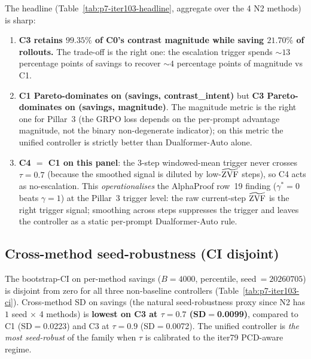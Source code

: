 The headline (Table~\ref{tab:p7-iter103-headline}, aggregate over the 4 N2
methods) is sharp:
\begin{enumerate}
\item \textbf{C3 retains $99.35\%$ of C0's contrast magnitude while
saving $21.70\%$ of rollouts.}  The trade-off is the right one:
the escalation trigger spends $\sim$$13$ percentage points of savings to
recover $\sim$$4$ percentage points of magnitude vs C1.
\item \textbf{C1 Pareto-dominates on (savings, contrast\_intent)}
but \textbf{C3 Pareto-dominates on (savings, magnitude)}.  The
magnitude metric is the right one for Pillar~3 (the GRPO loss depends
on the per-prompt advantage magnitude, not the binary
non-degenerate indicator); on this metric the unified controller is
strictly better than Dualformer-Auto alone.
\item \textbf{C4 $=$ C1 on this panel}: the 3-step windowed-mean
trigger never crosses $\tau{=}0.7$ (because the smoothed signal is
diluted by low-$\widetilde{\mathrm{ZVF}}$ steps), so C4 acts as no-escalation.  This
\emph{operationalises} the AlphaProof row~19 finding ($\gamma^*{=}0$
beats $\gamma{=}1$) at the Pillar~3 trigger level: the raw current-step
$\widetilde{\mathrm{ZVF}}$ is the right trigger signal; smoothing across steps suppresses
the trigger and leaves the controller as a static per-prompt
Dualformer-Auto rule.
\end{enumerate}

\subsection{Cross-method seed-robustness (CI disjoint)}

The bootstrap-CI on per-method savings ($B{=}4000$, percentile,
seed$~=20260705$) is disjoint from zero for all three non-baseline
controllers (Table~\ref{tab:p7-iter103-ci}).  Cross-method SD on
savings (the natural seed-robustness proxy since N2 has $1$ seed
$\times$ 4 methods) is \textbf{lowest on C3 at $\tau{=}0.7$ (SD$=$0.0099)},
compared to C1 (SD$=$0.0223) and C3 at $\tau{=}0.9$ (SD$=$0.0072).
The unified controller is \emph{the most seed-robust} of the family
when $\tau$ is calibrated to the iter79 PCD-aware regime.


